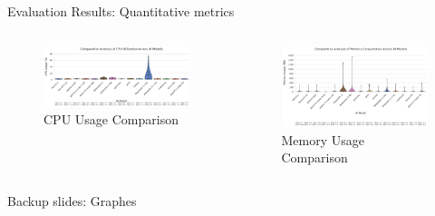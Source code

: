 \documentclass{beamer}
\begin{document}
\begin{frame}{Evaluation Results: Quantitative metrics}
  \begin{columns}[t]
      \begin{figure}
        \centering
        \includegraphics[width=0.9\columnwidth]{model_cpu_usage_comparison.png}
        \caption{CPU Usage Comparison}
        \label{fig:cpu-usage}
      \end{figure}
      \begin{figure}
        \centering
        \includegraphics[width=0.9\columnwidth]{model_memory_usage_comparison.png}
        \caption{Memory Usage Comparison}
        \label{fig:memory-usage}
      \end{figure}
  \end{columns}
\end{frame}

\begin{frame}[plain]
  
  \centering
  \vspace{1cm}
  \Huge Backup slides: Graphes
\end{frame}
\end{document}

